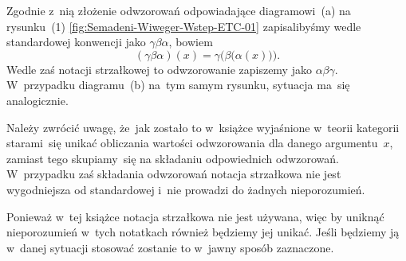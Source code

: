 Zgodnie z~nią złożenie odwzorowań odpowiadające diagramowi~(a) na
rysunku~(1) \eqref{fig:Semadeni-Wiweger-Wstep-ETC-01} zapisalibyśmy wedle
standardowej konwencji jako $\gamma \beta \alpha$, bowiem
\begin{equation}
  \label{eq:Semadeni-Wiweger-Wstep-ETC-01}
  ( \gamma \beta \alpha )( x ) = \gamma\big( \beta\big( \alpha( x ) \big) \big).
\end{equation}
Wedle zaś notacji strzałkowej to odwzorowanie zapiszemy jako $\alpha \beta \gamma$.
W~przypadku diagramu~(b) na~tym samym rysunku, sytuacja ma~się analogicznie.

Należy zwrócić uwagę, że~jak zostało to w~książce wyjaśnione w~teorii
kategorii starami~się unikać obliczania wartości odwzorowania dla danego
argumentu~$x$, zamiast tego skupiamy~się na składaniu odpowiednich
odwzorowań. W~przypadku zaś składania odwzorowań notacja strzałkowa nie jest
wygodniejsza od standardowej i~nie prowadzi do żadnych nieporozumień.

Ponieważ w~tej książce notacja strzałkowa nie jest używana, więc by uniknąć
nieporozumień w~tych notatkach również będziemy jej unikać. Jeśli będziemy
ją w~danej sytuacji stosować zostanie to w~jawny sposób zaznaczone.





